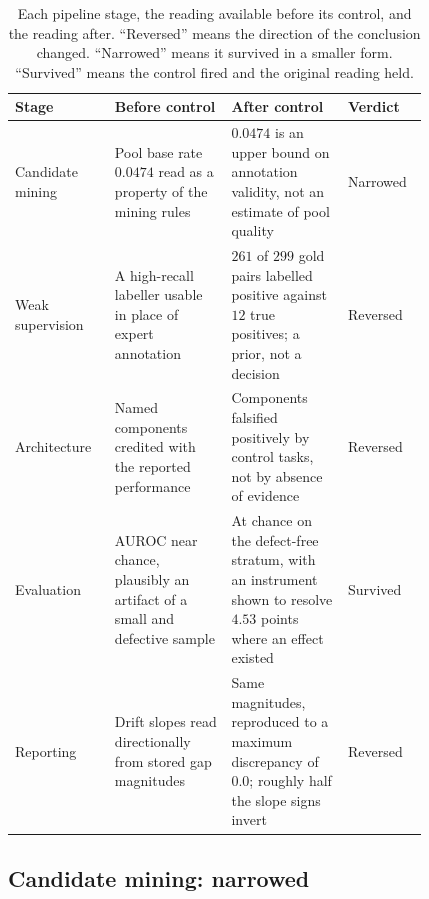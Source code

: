 \begin{table}[H]
\centering
\caption{Each pipeline stage, the reading available before its control, and the
reading after. ``Reversed'' means the direction of the conclusion changed.
``Narrowed'' means it survived in a smaller form. ``Survived'' means the control
fired and the original reading held.}
\label{tab:disc-spine}
\small
\begin{tabular}{p{0.18\linewidth}p{0.25\linewidth}p{0.25\linewidth}p{0.14\linewidth}}
\toprule
\textbf{Stage} & \textbf{Before control} & \textbf{After control}
& \textbf{Verdict} \\
\midrule
Candidate mining & Pool base rate $0.0474$ read as a property of the mining rules & $0.0474$ is an upper bound on annotation validity, not an estimate of pool quality & Narrowed \\
\addlinespace
Weak supervision & A high-recall labeller usable in place of expert annotation & $261$ of $299$ gold pairs labelled positive against $12$ true positives; a prior, not a decision & Reversed \\
\addlinespace
Architecture & Named components credited with the reported performance & Components falsified positively by control tasks, not by absence of evidence & Reversed \\
\addlinespace
Evaluation & AUROC near chance, plausibly an artifact of a small and defective sample & At chance on the defect-free stratum, with an instrument shown to resolve $4.53$ points where an effect existed & Survived \\
\addlinespace
Reporting & Drift slopes read directionally from stored gap magnitudes & Same magnitudes, reproduced to a maximum discrepancy of $0.0$; roughly half the slope signs invert & Reversed \\
\bottomrule
\end{tabular}
\end{table}

\subsection{Candidate mining: narrowed}

